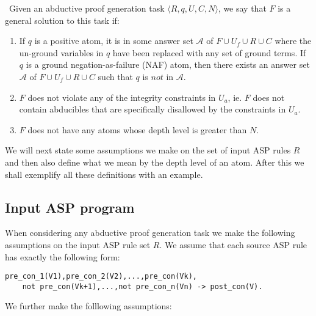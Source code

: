 \begin{definition}\label{def:abductive_proof_generation_solution} \
Given an abductive proof generation task $\langle R,q,U,C,N \rangle$, we say that $F$ is a general solution to this task if:
\begin{enumerate}
    \item If $q$ is a positive atom, it is in some answer set $\mathcal{A}$ of $F\cup U_{f}\cup R\cup C$ where the un-ground variables in $q$ have been replaced with any set of ground terms. If $q$ is a ground negation-as-failure (NAF) atom, then there exists an answer set $\mathcal{A}$ of $F\cup U_{f}\cup R\cup C$ such that $q$ is $not$ in $\mathcal{A}$.
    \item $F$ does not violate any of the integrity constraints in $U_{a}$, ie. $F$ does not contain abducibles that are specifically disallowed by the constraints in $U_{a}$.
    \item $F$ does not have any atoms whose depth level is greater than $N$.
\end{enumerate}
\end{definition} We will next state some assumptions we make on the set of input ASP rules $R$ and then also define what we mean by the depth level of an atom. After this we shall exemplify all these definitions with an example. 
\subsection{Input ASP program}
When considering any abductive proof generation task we make the following assumptions on the input ASP rule set $R$. We assume that each source ASP rule has exactly the following form:
\begin{lstlisting}[frame=none]
pre_con_1(V1),pre_con_2(V2),...,pre_con(Vk),
    not pre_con(Vk+1),...,not pre_con_n(Vn) -> post_con(V).
\end{lstlisting}
We further make the folllowing assumptions:

